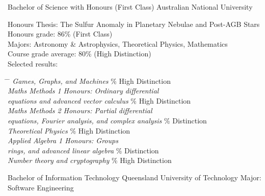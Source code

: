 \documentclass[11pt]{article} %
\begin{document}
{Bachelor of Science with Honours (First Class)}
{}{Australian National University}
{
Honours Thesis: The Sulfur Anomaly in Planetary Nebulae and Post-AGB Stars\\
Honours grade: 86\% (First Class)\\
Majors: Astronomy \& Astrophysics, Theoretical Physics, Mathematics\\
Course grade average: 80\% (High Distinction)\\
Selected results:
\begin{tabbing}\hspace{5pt} \= \hspace{9cm} \= \kill
\>\+\textit{Games, Graphs, and Machines} \% High Distinction\\
\textit{Maths Methods 1 Honours: Ordinary differential}\\\textit{\quad equations and advanced vector calculus} \% High Distinction \\
\textit{Maths Methods 2 Honours: Partial differential}\\\textit{\quad equations, Fourier analysis, and complex analysis} \% Distinction \\
\textit{Theoretical Physics} \% High Distinction \\
\textit{Applied Algebra 1 Honours: Groups}\\\textit{\quad rings, and advanced linear algebra} \% Distinction \\
\textit{Number theory and cryptography} \% High Distinction
\end{tabbing}
}

{Bachelor of Information Technology}
{}{Queensland University of Technology}
{
Major: Software Engineering
}


\end{document}
